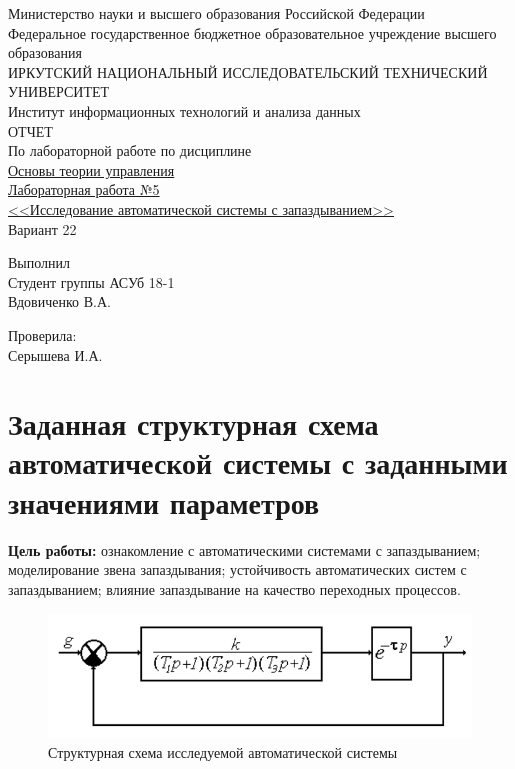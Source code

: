 \documentclass[12pt]{article}
\begin{document}
\begin{titlepage}
\begin{center}
Министерство науки и высшего образования Российской Федерации\\
Федеральное государственное бюджетное образовательное учреждение высшего образования\\
ИРКУТСКИЙ НАЦИОНАЛЬНЫЙ ИССЛЕДОВАТЕЛЬСКИЙ ТЕХНИЧЕСКИЙ УНИВЕРСИТЕТ\\
Институт информационных технологий и анализа данных\\
\vspace{7cm}
\large ОТЧЕТ\\
По лабораторной работе по дисциплине\\
\underline{Основы теории управления}\\
\underline{Лабораторная работа №5}\\
\underline{<<Исследование автоматической системы с запаздыванием>>}\\
Вариант 22
\end{center}
\vspace{9cm}
\begin{flushright}
Выполнил \\
Студент группы АСУб 18-1 \\
Вдовиченко В.А. \\
\end{flushright}
\begin{flushright}
Проверила:\\
Серышева И.А. \\
\end{flushright}
\end{titlepage}
\section{Заданная структурная схема автоматической системы с заданными значениями параметров}
\textbf{Цель работы: } ознакомление с автоматическими системами с запаздыванием; моделирование звена запаздывания; устойчивость автоматических систем с запаздыванием; влияние запаздывание на качество переходных процессов. \\
\begin{figure}[h]
    \label{graphs}
     \centering
    \includegraphics[width = 12cm]{структурная схема.png}
    \caption{Структурная схема исследуемой автоматической системы}
\end{figure}
 
\end{document}
